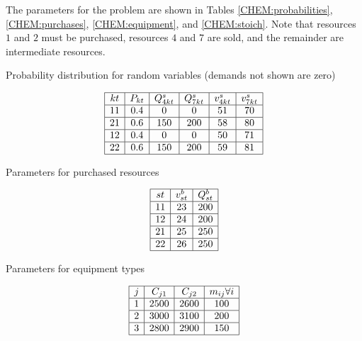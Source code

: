The parameters for the problem are shown in Tables \ref{CHEM:probabilities}, \ref{CHEM:purchases}, \ref{CHEM:equipment}, and \ref{CHEM:stoich}.  Note that resources $1$ and $2$ must be purchased, resources $4$ and $7$ are sold, and the remainder are intermediate resources.

\begin{table}[ht]
\caption[Probability distribution for test problem in batch chemical plant design]{Probability distribution for random variables (demands not shown are zero)}
\label{CHEM:probabilities}
\[
\begin{array}{|c|c|c|c|c|c|}
	\hline
	kt & P_{kt} & Q^s_{4kt} & Q^s_{7kt} & v^s_{4kt} & v^s_{7kt}\\ \hline
	11 & 0.4    & 0		& 0	    & 51	& 70\\ \hline
	21 & 0.6    & 150	& 200	    & 58	& 80\\ \hline
	12 & 0.4    & 0		& 0	    & 50	& 71\\ \hline
	22 & 0.6    & 150	& 200	    & 59	& 81\\ \hline
\end{array}
\]
\end{table}

\begin{table}[ht]
\caption[Purchase parameters for test problem in batch chemical plant design]{Parameters for purchased resources}
\label{CHEM:purchases}
\[
\begin{array}{|c|c|c|}
	\hline
	st	& v^b_{st}	& Q^b_{st}\\ \hline
	11	& 23		& 200\\ \hline
	12	& 24		& 200\\ \hline
	21	& 25		& 250\\ \hline
	22	& 26		& 250\\ \hline
\end{array}
\]
\end{table}

\begin{table}
\caption[Equipment parameters for test problem in batch chemical plant design]{Parameters for equipment types}
\label{CHEM:equipment}
\[
\begin{array}{|c|c|c|c|}
	\hline
	j	& C_{j1}	& C_{j2}	& m_{ij} \forall i\\ \hline
	1	& 2500		& 2600		& 100\\ \hline
	2	& 3000		& 3100		& 200\\ \hline
	3	& 2800		& 2900		& 150\\ \hline
\end{array}
\]
\end{table}

